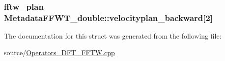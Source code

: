 \subsubsection[{velocityplan\+\_\+backward}]{\setlength{\rightskip}{0pt plus 5cm}fftw\+\_\+plan Metadata\+F\+F\+W\+T\+\_\+double\+::velocityplan\+\_\+backward\mbox{[}2\mbox{]}}\label{struct_metadata_f_f_w_t__double_ade6f127e609361c0c5a785a661c94fd5}


The documentation for this struct was generated from the following file\+:\begin{DoxyCompactItemize}
\item 
source/\hyperlink{_operators___d_f_t___f_f_t_w_8cpp}{Operators\+\_\+\+D\+F\+T\+\_\+\+F\+F\+T\+W.\+cpp}\end{DoxyCompactItemize}
